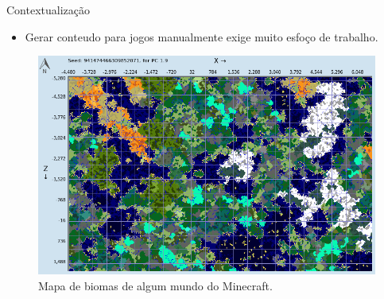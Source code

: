 \begin{frame}{Contextualização}
    \begin{itemize} \setlength\itemsep{1em}
        \item Gerar conteudo para jogos manualmente exige muito esfoço de trabalho.
    \end{itemize}
    
    \begin{figure}[H]
        \centering
        \includegraphics[width=.6\textwidth, height=.5\textheight]{img/chunkbasebiomes}
        \caption{Mapa de biomas de algum mundo do Minecraft.}
        \label{fig:chunkbasebiomes}
    \end{figure}
    
\end{frame}
